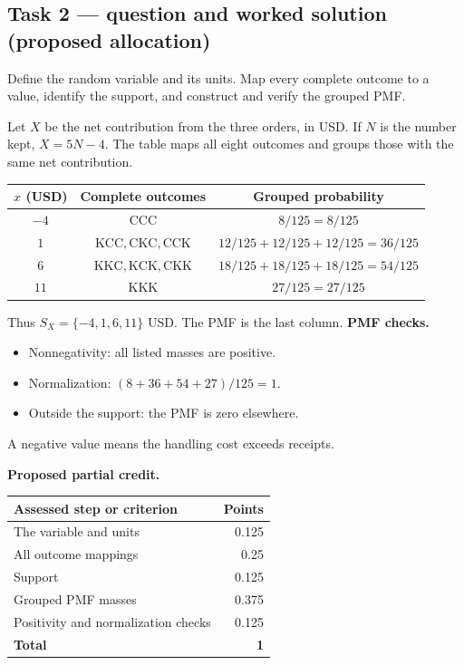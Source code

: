 \par\vspace{3mm}\secInicio[][sec:q1]

\subsection*{Task 2 --- question and worked solution (proposed allocation) }
\label{sol:q1t2}

Define the random variable and its units. Map every complete outcome to a value, identify the support, and construct and verify the grouped PMF.

Let $X$ be the net contribution from the three orders, in USD. If $N$ is the number kept, $X=5N-4$. The table maps all eight outcomes and groups those with the same net contribution.

\begin{center}
\begin{tabular}{ccc}\toprule
$x$ (USD) & Complete outcomes & Grouped probability\\\midrule
$-4$ & $\mathrm{CCC}$ & $8/125=8/125$\\
$1$ & $\mathrm{KCC},\mathrm{CKC},\mathrm{CCK}$ & $12/125+12/125+12/125=36/125$\\
$6$ & $\mathrm{KKC},\mathrm{KCK},\mathrm{CKK}$ & $18/125+18/125+18/125=54/125$\\
$11$ & $\mathrm{KKK}$ & $27/125=27/125$\\
\bottomrule\end{tabular}
\end{center}

Thus $S_X=\{-4,1,6,11\}$ USD. The PMF is the last column.
\textbf{PMF checks.}
\begin{itemize}
\item Nonnegativity: all listed masses are positive.
\item Normalization: $(8+36+54+27)/125=1$.
\item Outside the support: the PMF is zero elsewhere.
\end{itemize}

A negative value means the handling cost exceeds receipts.

\par\smallskip
\noindent\begin{minipage}{\linewidth}
\textbf{Proposed partial credit.}\par\smallskip
\begin{tabularx}{\linewidth}{@{}>{\raggedright\arraybackslash}X r@{}}\toprule
\textbf{Assessed step or criterion} & \textbf{Points}\\\midrule
The variable and units & 0.125\\
All outcome mappings & 0.25\\
Support & 0.125\\
Grouped PMF masses & 0.375\\
Positivity and normalization checks & 0.125\\
\midrule
\textbf{Total} & \textbf{1}\\
\bottomrule\end{tabularx}
\end{minipage}\par\smallskip

